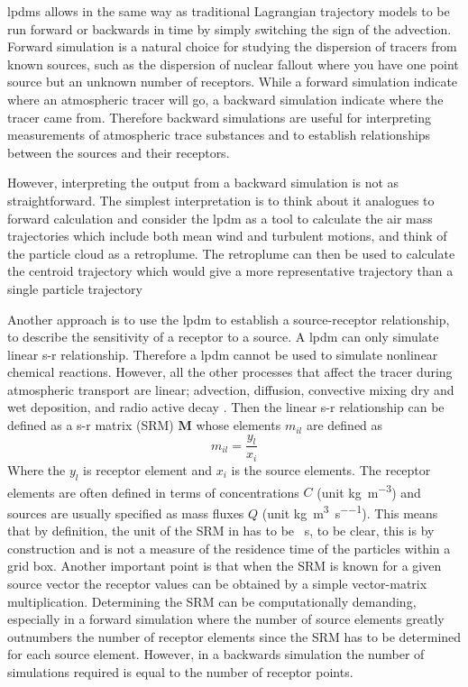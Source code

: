 \acrshort{lpdm}s allows in the same way as traditional Lagrangian trajectory 
models to be run forward or backwards in time by simply switching the sign of the advection. Forward 
simulation is a natural choice for studying the dispersion of tracers from known sources, such as the 
dispersion of nuclear fallout where you have one point source but an unknown number of receptors. While a 
forward simulation indicate where an atmospheric tracer will go, a backward simulation indicate where the 
tracer came from. Therefore backward simulations are useful for interpreting measurements of atmospheric 
trace substances and to establish relationships between the sources and their receptors. 

However, interpreting the output from a backward simulation is not as straightforward. The simplest interpretation is
to think about it analogues to forward calculation and consider the \acrshort{lpdm} as a tool to calculate the air mass 
trajectories which include both mean wind and turbulent motions, and think of the particle cloud as a 
retroplume. The retroplume can then be used to calculate the centroid trajectory which would give a more 
representative trajectory than a single particle trajectory

Another approach is to use the \acrshort{lpdm} to establish a source-receptor relationship, to describe the sensitivity of a 
receptor to a source. A \acrshort{lpdm} can only simulate linear s-r relationship. Therefore a \acrshort{lpdm} cannot be used to 
simulate nonlinear chemical reactions. However, all the other processes that affect the tracer during 
atmospheric transport are linear; advection, diffusion, convective mixing dry and wet deposition, and radio 
active decay \parencite{seibert2004source}. Then the linear s-r relationship  can be defined as a s-r matrix 
(SRM) $\mathbf{M}$ whose elements $m_{il}$ are defined as
\begin{equation}\label{eq:s-r_relationship}
    m_{il} = \frac{y_l}{x_i}
\end{equation}
Where the $y_l$ is receptor element and $x_i$ is the source elements. The receptor elements are often 
defined in terms of concentrations $C$ (unit \si{\kg\per\cubic\metre}) and sources are usually specified as 
mass fluxes $Q$ (unit \si{\kg\per\cubic\metre\per\s}). 
This means that by definition, the unit of the SRM in  has to be \si{\per\s}, to be clear, this is by construction and is not a measure of the residence time of the particles within a grid box. Another important point is that when the SRM is known for a given source vector the receptor values can be obtained by a simple vector-matrix multiplication. Determining the SRM can be computationally demanding, especially in a forward simulation where the number of source elements greatly outnumbers the number of receptor elements since the SRM has to be determined for each source element. However, in a backwards simulation the number of simulations required is equal to the number of receptor points. 

